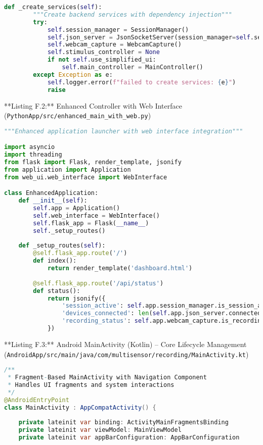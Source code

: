 \documentclass[11pt,a4paper]{report}
\begin{document}
{\begin{lstlisting}[language=Python]
    def _create_services(self):
        """Create backend services with dependency injection"""
        try:
            self.session_manager = SessionManager()
            self.json_server = JsonSocketServer(session_manager=self.session_manager)
            self.webcam_capture = WebcamCapture()
            self.stimulus_controller = None
            if not self.use_simplified_ui:
                self.main_controller = MainController()
        except Exception as e:
            self.logger.error(f"failed to create services: {e}")
            raise
\end{lstlisting}

**Listing F.2:** Enhanced Controller with Web Interface (\texttt{PythonApp/src/enhanced\_main\_with\_web.py})
\begin{lstlisting}[language=Python]
"""Enhanced application launcher with web interface integration"""

import asyncio
import threading
from flask import Flask, render_template, jsonify
from application import Application
from web_ui.web_interface import WebInterface

class EnhancedApplication:
    def __init__(self):
        self.app = Application()
        self.web_interface = WebInterface()
        self.flask_app = Flask(__name__)
        self._setup_routes()
    
    def _setup_routes(self):
        @self.flask_app.route('/')
        def index():
            return render_template('dashboard.html')
        
        @self.flask_app.route('/api/status')
        def status():
            return jsonify({
                'session_active': self.app.session_manager.is_session_active(),
                'devices_connected': len(self.app.json_server.connected_devices),
                'recording_status': self.app.webcam_capture.is_recording()
            })
\end{lstlisting}

**Listing F.3:** Android MainActivity (Kotlin) – Core Lifecycle Management (\texttt{AndroidApp/src/main/java/com/multisensor/recording/MainActivity.kt})
\begin{lstlisting}[language=Java]
/**
 * Fragment-Based MainActivity with Navigation Component
 * Handles UI fragments and system interactions
 */
@AndroidEntryPoint
class MainActivity : AppCompatActivity() {
    
    private lateinit var binding: ActivityMainFragmentsBinding
    private lateinit var viewModel: MainViewModel
    private lateinit var appBarConfiguration: AppBarConfiguration
    

\end{lstlisting}}
\end{document}
